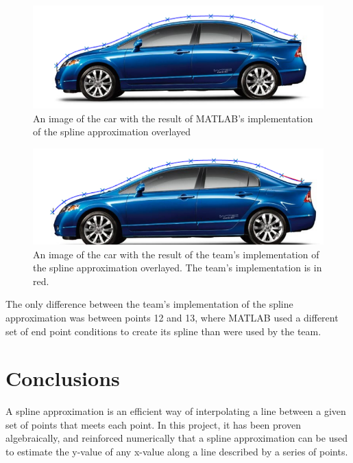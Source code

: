 \documentclass[12pt, letterpaper]{article} %
\begin{document}
\begin{figure}[H]
	\centering
		\includegraphics[scale=0.5]{car_with_matlab_spline.png}
		\caption{An image of the car with the result of MATLAB's implementation of the spline approximation overlayed}
\end{figure}

\begin{figure}[H]
	\centering
		\includegraphics[scale=0.5]{car_with_both_splines.png}
		\caption{An image of the car with the result of the team's implementation of the spline approximation overlayed. The team's implementation is in red.}
\end{figure}

The only difference between the team's implementation of the spline approximation was between points 12 and 13, where MATLAB used a different set of end point conditions to create its spline than were used by the team.

\section{Conclusions}
A spline approximation is an efficient way of interpolating a line between a given set of points that meets each point. In this project, it has been proven algebraically, and reinforced numerically that a spline approximation can be used to estimate the y-value of any x-value along a line described by a series of points.
\end{document}
